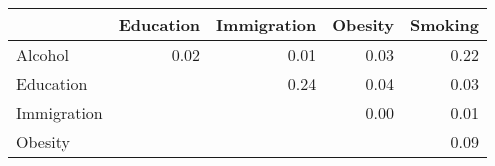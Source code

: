 \begin{longtable}{l|rrrr}
\toprule
\multicolumn{1}{l}{} & Education & Immigration & Obesity & Smoking \\ 
\midrule
Alcohol & 0.02 & 0.01 & 0.03 & 0.22 \\ 
Education &  & 0.24 & 0.04 & 0.03 \\ 
Immigration &  &  & 0.00 & 0.01 \\ 
Obesity &  &  &  & 0.09 \\ 
\bottomrule
\end{longtable}

